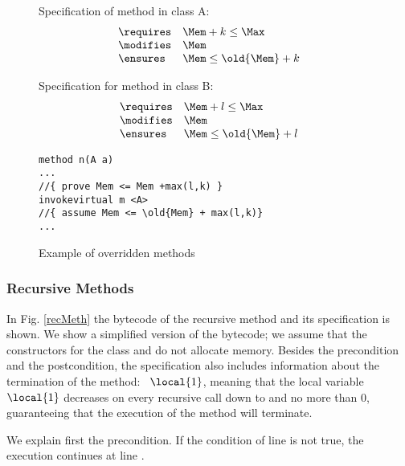\begin{figure}[!htp]
Specification of method \methodd{} in class A:
$$
\begin{array}{ll}
\requires & \Mem + k  \leq \Max \\
\modifies & \Mem \\
\ensures & \Mem  \leq \old{\Mem} + k
\end{array}
$$

Specification for method \methodd{} in class B:
$$
\begin{array}{ll}
\requires & \Mem + l  \leq \Max \\
\modifies & \Mem \\
\ensures & \Mem  \leq \old{\Mem} + l
\end{array}
$$

\begin{verbatim}
method n(A a)
...
//{ prove Mem <= Mem +max(l,k) }
invokevirtual m <A>
//{ assume Mem <= \old{Mem} + max(l,k)}
...
\end{verbatim}
\caption{\sc Example of overridden methods}
\label{classExt}
\end{figure}


\subsubsection{Recursive Methods} In Fig. \ref{recMeth} the bytecode of the recursive method \methodd{} and its specification is shown. 
 We show a simplified version of the bytecode; we assume that the constructors for the class  and 
 do not allocate memory. Besides the precondition and the postcondition, the specification also includes information 
 about the termination of the method: \variant\ $\local{1}$, meaning that the local variable $\local{1}$ decreases on every recursive call down to and no more than $0$, guaranteeing
 that the execution of the method will terminate.
 

We explain first the precondition. If the condition of line  is not true, the execution continues at line .

